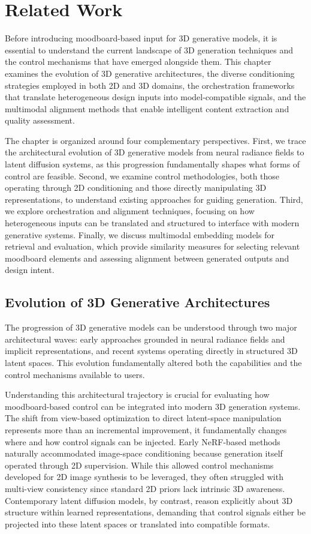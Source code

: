 \chapter{Related Work}
\label{chap:rel_work}

Before introducing moodboard-based input for 3D generative models, it is essential to understand the current landscape of 3D generation techniques and the control mechanisms that have emerged alongside them. This chapter examines the evolution of 3D generative architectures, the diverse conditioning strategies employed in both 2D and 3D domains, the orchestration frameworks that translate heterogeneous design inputs into model-compatible signals, and the multimodal alignment methods that enable intelligent content extraction and quality assessment.

The chapter is organized around four complementary perspectives. First, we trace the architectural evolution of 3D generative models from neural radiance fields to latent diffusion systems, as this progression fundamentally shapes what forms of control are feasible. Second, we examine control methodologies, both those operating through 2D conditioning and those directly manipulating 3D representations, to understand existing approaches for guiding generation. Third, we explore orchestration and alignment techniques, focusing on how heterogeneous inputs can be translated and structured to interface with modern generative systems. Finally, we discuss multimodal embedding models for retrieval and evaluation, which provide similarity measures for selecting relevant moodboard elements and assessing alignment between generated outputs and design intent.

\section{Evolution of 3D Generative Architectures}

The progression of 3D generative models can be understood through two major architectural waves: early approaches grounded in neural radiance fields and implicit representations, and recent systems operating directly in structured 3D latent spaces. This evolution fundamentally altered both the capabilities and the control mechanisms available to users.

Understanding this architectural trajectory is crucial for evaluating how moodboard-based control can be integrated into modern 3D generation systems. The shift from view-based optimization to direct latent-space manipulation represents more than an incremental improvement, it fundamentally changes where and how control signals can be injected. Early NeRF-based methods naturally accommodated image-space conditioning because generation itself operated through 2D supervision. While this allowed control mechanisms developed for 2D image synthesis to be leveraged, they often struggled with multi-view consistency since standard 2D priors lack intrinsic 3D awareness. Contemporary latent diffusion models, by contrast, reason explicitly about 3D structure within learned representations, demanding that control signals either be projected into these latent spaces or translated into compatible formats.

